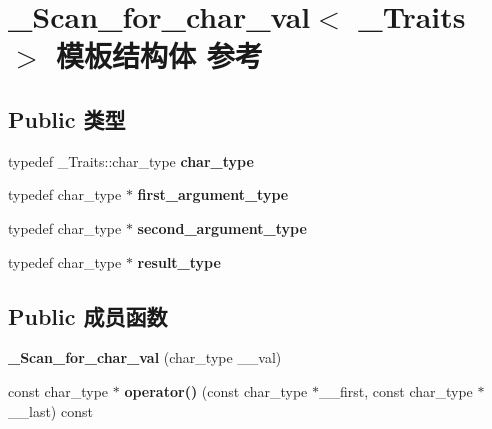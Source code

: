 \hypertarget{struct___scan__for__char__val}{}\section{\+\_\+\+Scan\+\_\+for\+\_\+char\+\_\+val$<$ \+\_\+\+Traits $>$ 模板结构体 参考}
\label{struct___scan__for__char__val}
\subsection*{Public 类型}
\begin{DoxyCompactItemize}
\item 
\mbox{\label{struct___scan__for__char__val_a257cf1b45bcfb5bf5fc37344c3b2043c}} 
typedef \+\_\+\+Traits\+::char\+\_\+type {\bfseries char\+\_\+type}
\item 
\mbox{\label{struct___scan__for__char__val_a5736c2fce4a864f6ca7f02f80b5f02dd}} 
typedef char\+\_\+type $\ast$ {\bfseries first\+\_\+argument\+\_\+type}
\item 
\mbox{\label{struct___scan__for__char__val_aa8b48254cc9527602507fafddf7845ef}} 
typedef char\+\_\+type $\ast$ {\bfseries second\+\_\+argument\+\_\+type}
\item 
\mbox{\label{struct___scan__for__char__val_a5e9c321edd7cd4751e0348c90dc7a6b9}} 
typedef char\+\_\+type $\ast$ {\bfseries result\+\_\+type}
\end{DoxyCompactItemize}
\subsection*{Public 成员函数}
\begin{DoxyCompactItemize}
\item 
\mbox{\label{struct___scan__for__char__val_a112fa08bed95cd7756104b0c6c433fed}} 
{\bfseries \+\_\+\+Scan\+\_\+for\+\_\+char\+\_\+val} (char\+\_\+type \+\_\+\+\_\+val)
\item 
\mbox{\label{struct___scan__for__char__val_a0a62a62f96e55078455dde013453281b}} 
const char\+\_\+type $\ast$ {\bfseries operator()} (const char\+\_\+type $\ast$\+\_\+\+\_\+first, const char\+\_\+type $\ast$\+\_\+\+\_\+last) const
\end{DoxyCompactItemize}
